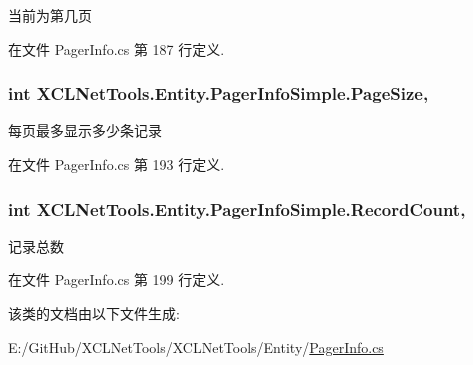 当前为第几页 



在文件 Pager\+Info.\+cs 第 187 行定义.

\subsubsection[{\texorpdfstring{Page\+Size}{PageSize}}]{\setlength{\rightskip}{0pt plus 5cm}int X\+C\+L\+Net\+Tools.\+Entity.\+Pager\+Info\+Simple.\+Page\+Size\hspace{0.3cm}{\ttfamily [get]}, {\ttfamily [set]}}\hypertarget{class_x_c_l_net_tools_1_1_entity_1_1_pager_info_simple_a3a8883f09f14d322edc5e8be13f75cb6}{}\label{class_x_c_l_net_tools_1_1_entity_1_1_pager_info_simple_a3a8883f09f14d322edc5e8be13f75cb6}


每页最多显示多少条记录 



在文件 Pager\+Info.\+cs 第 193 行定义.

\subsubsection[{\texorpdfstring{Record\+Count}{RecordCount}}]{\setlength{\rightskip}{0pt plus 5cm}int X\+C\+L\+Net\+Tools.\+Entity.\+Pager\+Info\+Simple.\+Record\+Count\hspace{0.3cm}{\ttfamily [get]}, {\ttfamily [set]}}\hypertarget{class_x_c_l_net_tools_1_1_entity_1_1_pager_info_simple_abe1bab597cad994b4515208cbb77f0bf}{}\label{class_x_c_l_net_tools_1_1_entity_1_1_pager_info_simple_abe1bab597cad994b4515208cbb77f0bf}


记录总数 



在文件 Pager\+Info.\+cs 第 199 行定义.



该类的文档由以下文件生成\+:\begin{DoxyCompactItemize}
\item 
E\+:/\+Git\+Hub/\+X\+C\+L\+Net\+Tools/\+X\+C\+L\+Net\+Tools/\+Entity/\hyperlink{_pager_info_8cs}{Pager\+Info.\+cs}\end{DoxyCompactItemize}
